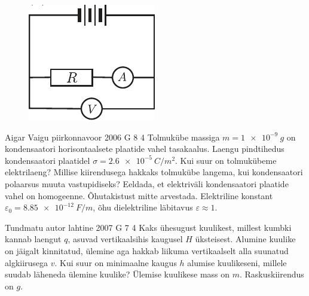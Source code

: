 \documentclass[11pt]{article}
\begin{document}
{{\begin{figure}[h]
\begin{minipage}[b]{0.3\textwidth}
		\includegraphics[width=\linewidth]{2005-v2g-04-yl2}
    \end{minipage}
\end{figure}

\fi
}

{Aigar Vaigu} %
{piirkonnavoor} %
{2006} %
{G 8} %
{4} %
{
\ifStatement
Tolmukübe massiga $m = \SI{1e-9}{g}$ on kondensaatori horisontaalsete plaatide vahel tasakaalus. Laengu pindtihedus kondensaatori plaatidel $\sigma = \SI{2,6e-5}{C/m^2}$. Kui suur on tolmukübeme elektrilaeng? Millise kiirendusega hakkaks tolmukübe langema, kui kondensaatori polaarsus muuta vastupidiseks? Eeldada, et elektriväli kondensaatori plaatide vahel on homogeenne. Õhutakistust mitte arvestada. Elektriline konstant $\varepsilon_0 = \SI{8,85e-12}{F/m}$, õhu dielektriline läbitavus $\varepsilon \approx 1$.
\fi
}

{Tundmatu autor} %
{lahtine} %
{2007} %
{G 7} %
{4} %
{
\ifStatement
Kaks ühesugust kuulikest, millest kumbki kannab laengut $q$, asuvad vertikaalsihis kaugusel $H$ üksteisest. Alumine kuulike on jäigalt kinnitatud, ülemine aga hakkab liikuma vertikaalselt alla suunatud algkiirusega $v$. Kui suur on minimaalne kaugus $h$ alumise kuulikeseni, millele suudab läheneda ülemine kuulike? Ülemise kuulikese mass on $m$. Raskuskiirendus on $g$.
\fi
}

}
\end{document}
